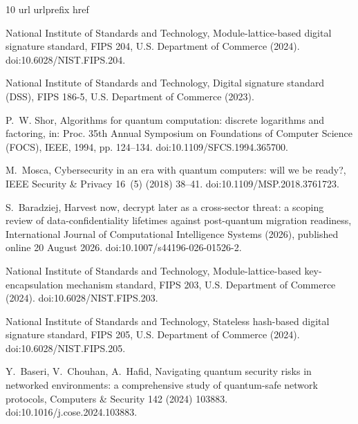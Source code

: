\documentclass[preprint,12pt]{elsarticle}
\begin{document}
\begin{thebibliography}{10}
\expandafter\ifx\csname url\endcsname\relax
  \def\url#1{\texttt{#1}}\fi
\expandafter\ifx\csname urlprefix\endcsname\relax\def\urlprefix{URL }\fi
\expandafter\ifx\csname href\endcsname\relax
  \def\href#1#2{#2} \def\path#1{#1}\fi

{National Institute of Standards and Technology}, Module-lattice-based digital
  signature standard, FIPS 204, U.S. Department of Commerce (2024).
\newblock \href {https://doi.org/10.6028/NIST.FIPS.204}
  {\path{doi:10.6028/NIST.FIPS.204}}.

{National Institute of Standards and Technology}, Digital signature standard
  (DSS), FIPS 186-5, U.S. Department of Commerce (2023).

P.~W. Shor, Algorithms for quantum computation: discrete logarithms and
  factoring, in: Proc. 35th Annual Symposium on Foundations of Computer Science
  (FOCS), IEEE, 1994, pp. 124--134.
\newblock \href {https://doi.org/10.1109/SFCS.1994.365700}
  {\path{doi:10.1109/SFCS.1994.365700}}.

M.~Mosca, Cybersecurity in an era with quantum computers: will we be ready?,
  IEEE Security \& Privacy 16~(5) (2018) 38--41.
\newblock \href {https://doi.org/10.1109/MSP.2018.3761723}
  {\path{doi:10.1109/MSP.2018.3761723}}.

S.~Baradziej, Harvest now, decrypt later as a cross-sector threat: a scoping
  review of data-confidentiality lifetimes against post-quantum migration
  readiness, International Journal of Computational Intelligence
  Systems (2026), published online 20 August 2026.
\newblock \href {https://doi.org/10.1007/s44196-026-01526-2}
  {\path{doi:10.1007/s44196-026-01526-2}}.

{National Institute of Standards and Technology}, Module-lattice-based
  key-encapsulation mechanism standard, FIPS 203, U.S. Department of Commerce
  (2024).
\newblock \href {https://doi.org/10.6028/NIST.FIPS.203}
  {\path{doi:10.6028/NIST.FIPS.203}}.

{National Institute of Standards and Technology}, Stateless hash-based digital
  signature standard, FIPS 205, U.S. Department of Commerce (2024).
\newblock \href {https://doi.org/10.6028/NIST.FIPS.205}
  {\path{doi:10.6028/NIST.FIPS.205}}.

Y.~Baseri, V.~Chouhan, A.~Hafid, Navigating quantum security risks in networked
  environments: a comprehensive study of quantum-safe network protocols,
  Computers \& Security 142 (2024) 103883.
\newblock \href {https://doi.org/10.1016/j.cose.2024.103883}
  {\path{doi:10.1016/j.cose.2024.103883}}.


\end{thebibliography}
\end{document}
